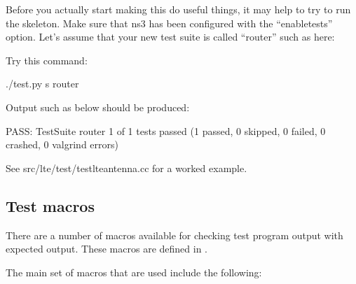 \documentclass[letterpaper,10pt,english]{sphinxmanual}
\renewcommand{\sphinxcode}[1]{\texttt{\small{#1}}}
\begin{document}
Before you actually start making this do useful things, it may help
to try to run the skeleton.  Make sure that ns\sphinxhyphen{}3 has been configured with
the “\textendash{}enable\sphinxhyphen{}tests” option.  Let’s assume that your new test suite
is called “router” such as here:

\begin{sphinxVerbatim}[commandchars=\\\{\}]
 
     
\end{sphinxVerbatim}

Try this command:

\begin{sphinxVerbatim}[commandchars=\\\{\}]
\PYGZdl{} ./test.py \PYGZhy{}s router
\end{sphinxVerbatim}

Output such as below should be produced:

\begin{sphinxVerbatim}[commandchars=\\\{\}]
PASS: TestSuite router
1 of 1 tests passed (1 passed, 0 skipped, 0 failed, 0 crashed, 0 valgrind errors)
\end{sphinxVerbatim}

See src/lte/test/test\sphinxhyphen{}lte\sphinxhyphen{}antenna.cc for a worked example.


\subsection{Test macros}
\label{\detokenize{how-to-write-tests:test-macros}}
There are a number of macros available for checking test program
output with expected output.  These macros are defined in
\sphinxcode{}.

The main set of macros that are used include the following:

\begin{sphinxVerbatim}[commandchars=\\\{\}]
  
  
  
  
   
\end{sphinxVerbatim}
\end{document}
